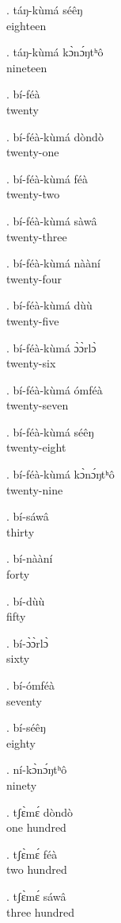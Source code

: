 \documentclass{assets/fieldnotes}
\begin{document}
\ex. táŋ-kùmá séêŋ\\
eighteen 

\ex. táŋ-kùmá kɔ̀nɔ́ŋtʰô\\
nineteen

\ex. bí-féà\\
twenty

\ex. bí-féà-kùmá dòndò\\
twenty-one

\ex. bí-féà-kùmá féà\\
twenty-two

\ex. bí-féà-kùmá sàwâ\\
twenty-three

\ex. bí-féà-kùmá nààní\\
twenty-four

\ex. bí-féà-kùmá dùù\\
twenty-five

\ex. bí-féà-kùmá ɔ̀ɔ̀rlɔ̀\\
twenty-six

\ex. bí-féà-kùmá ómféà\\
twenty-seven

\ex. bí-féà-kùmá séêŋ\\
twenty-eight

\ex. bí-féà-kùmá kɔ̀nɔ́ŋtʰô\\
twenty-nine

\ex. bí-sáwâ\\
thirty\\

\ex. bí-nààní\\
forty

\ex. bí-dùù\\
fifty

\ex. bí-ɔ̀ɔ̀rlɔ̀\\
sixty

\ex. bí-ómféà\\
seventy

\ex. bí-séêŋ\\
eighty

\ex. ní-kɔ̀nɔ́ŋtʰô\\
ninety

\ex. tʃɛ̀mɛ́ dòndò\\
one hundred\\


\ex. tʃɛ̀mɛ́ féà\\
two hundred

\ex. tʃɛ̀mɛ́ sáwâ\\
three hundred
\end{document}
